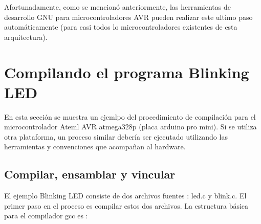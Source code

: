 \documentclass[12pt]{article}
\begin{document}
Afortunadamente, como se mencionó anteriormente, las herramientas de desarrollo
GNU para microcontroladores AVR pueden realizar este ultimo paso automáticamente
(para casi todos lo microcontroladores existentes de esta arquitectura).

\section *{Compilando el programa Blinking LED}

En esta sección se muestra un ejemlpo del procedimiento de compilación 
para el microcontrolador Ateml AVR atmega328p (placa arduino pro mini).
Si se utiliza otra plataforma, un proceso similar debería ser ejecutado
utilizando las herramientas y convenciones que acompañan al hardware.


\subsection {Compilar, ensamblar y vincular}

El ejemplo Blinking LED consiste de dos archivos fuentes : led.c y blink.c.
El primer paso en el proceso es compilar estos dos archivos.
La estructura básica para el compilador gcc es :
\end{document}
